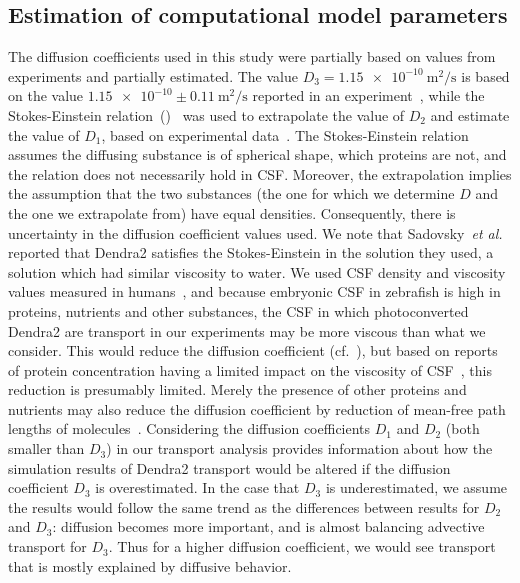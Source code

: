 \documentclass{WileyMSP-template}
\begin{document}
\subsection{Estimation of computational model parameters}
The diffusion coefficients used in this study were partially based on values
from experiments and partially estimated. The value $D_3=\num{1.15e-10} \ \mathrm{m^2/s}$
is based on the value $\num{1.15e-10} \pm 0.11 \ \mathrm{m^2/s}$ reported in an
experiment~\cite{GuraSadovsky2017MeasurementExpansion}, while the Stokes-Einstein
relation~()~\cite{Einstein1905UberTeilchen} was used to extrapolate
the value of $D_2$ and estimate the value of $D_1$, based on experimental
data~\cite{Swaminathan1997PhotobleachingDiffusion, Potma2001ReducedCells,
Mahmood2023ExosomeTemperature}. The Stokes-Einstein relation assumes the diffusing
substance is of spherical shape, which proteins are not, and the relation does not
necessarily hold in CSF. Moreover, the extrapolation implies the assumption that
the two substances (the one for which we determine $D$ and the one we extrapolate from)
have equal densities. Consequently, there is uncertainty in the diffusion coefficient values used.
We note that Sadovsky~\emph{et al.}~\cite{GuraSadovsky2017MeasurementExpansion} reported that
Dendra2 satisfies the Stokes-Einstein in the solution they used,
a solution which had similar viscosity
to water. We used CSF density and viscosity values measured in
humans~\cite{Bloomfield1998EffectsFluid},
and because embryonic CSF in zebrafish is high in proteins, nutrients and other substances,
the CSF in which photoconverted Dendra2 are transport in our experiments may be more viscous
than what we consider. This would reduce the diffusion coefficient (cf.~),
but based on reports of protein concentration having a limited impact on the viscosity of
CSF~\cite{Bloomfield1998EffectsFluid, Brydon1995PhysicalViscosity}, this reduction is presumably
limited. Merely the presence of other proteins and nutrients may also reduce the diffusion
coefficient by reduction of mean-free path lengths of molecules~\cite{Cussler2009Diffusion:Systems}.
Considering the diffusion coefficients $D_1$ and $D_2$ (both smaller
than $D_3$) in our transport analysis provides information about how the simulation
results of Dendra2 transport would be altered if the
diffusion coefficient $D_3$ is overestimated. In the case that $D_3$ is
underestimated, we assume the
results would follow the same trend as the differences between results for
$D_2$ and $D_3$: diffusion becomes
more important, and is almost balancing advective transport for $D_3$. 
Thus for a higher diffusion coefficient, we would see transport that is
mostly explained by diffusive behavior.
\end{document}
